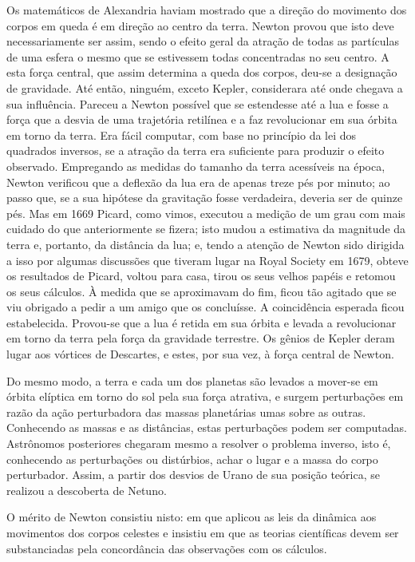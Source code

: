 \documentclass[11pt,a5paper,twoside,openany]{book}
\begin{document}
Os matemáticos de Alexandria haviam mostrado que a direção do movimento dos corpos em queda é em direção ao centro da terra. Newton provou que isto deve necessariamente ser assim, sendo o efeito geral da atração de todas as partículas de uma esfera o mesmo que se estivessem todas concentradas no seu centro. A esta força central, que assim determina a queda dos corpos, deu-se a designação de gravidade. Até então, ninguém, exceto Kepler, considerara até onde chegava a sua influência. Pareceu a Newton possível que se estendesse até a lua e fosse a força que a desvia de uma trajetória retilínea e a faz revolucionar em sua órbita em torno da terra. Era fácil computar, com base no princípio da lei dos quadrados inversos, se a atração da terra era suficiente para produzir o efeito observado. Empregando as medidas do tamanho da terra acessíveis na época, Newton verificou que a deflexão da lua era de apenas treze pés por minuto; ao passo que, se a sua hipótese da gravitação fosse verdadeira, deveria ser de quinze pés. Mas em 1669 Picard, como vimos, executou a medição de um grau com mais cuidado do que anteriormente se fizera; isto mudou a estimativa da magnitude da terra e, portanto, da distância da lua; e, tendo a atenção de Newton sido dirigida a isso por algumas discussões que tiveram lugar na Royal Society em 1679, obteve os resultados de Picard, voltou para casa, tirou os seus velhos papéis e retomou os seus cálculos. À medida que se aproximavam do fim, ficou tão agitado que se viu obrigado a pedir a um amigo que os concluísse. A coincidência esperada ficou estabelecida. Provou-se que a lua é retida em sua órbita e levada a revolucionar em torno da terra pela força da gravidade terrestre. Os gênios de Kepler deram lugar aos vórtices de Descartes, e estes, por sua vez, à força central de Newton.

Do mesmo modo, a terra e cada um dos planetas são levados a mover-se em órbita elíptica em torno do sol pela sua força atrativa, e surgem perturbações em razão da ação perturbadora das massas planetárias umas sobre as outras. Conhecendo as massas e as distâncias, estas perturbações podem ser computadas. Astrônomos posteriores chegaram mesmo a resolver o problema inverso, isto é, conhecendo as perturbações ou distúrbios, achar o lugar e a massa do corpo perturbador. Assim, a partir dos desvios de Urano de sua posição teórica, se realizou a descoberta de Netuno.

O mérito de Newton consistiu nisto: em que aplicou as leis da dinâmica aos movimentos dos corpos celestes e insistiu em que as teorias científicas devem ser substanciadas pela concordância das observações com os cálculos.
\end{document}
